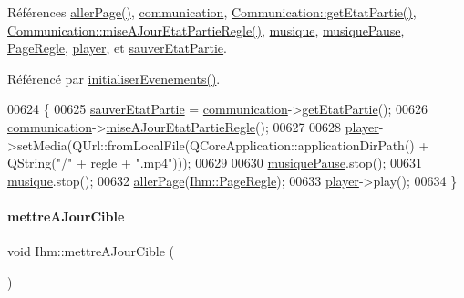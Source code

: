 Références \hyperlink{ihm_8cpp_source_l00429}{aller\+Page()}, \hyperlink{ihm_8h_source_l00054}{communication}, \hyperlink{communication_8cpp_source_l00049}{Communication\+::get\+Etat\+Partie()}, \hyperlink{communication_8cpp_source_l00426}{Communication\+::mise\+A\+Jour\+Etat\+Partie\+Regle()}, \hyperlink{ihm_8h_source_l00056}{musique}, \hyperlink{ihm_8h_source_l00057}{musique\+Pause}, \hyperlink{ihm_8h_source_l00075}{Page\+Regle}, \hyperlink{ihm_8h_source_l00064}{player}, et \hyperlink{ihm_8h_source_l00059}{sauver\+Etat\+Partie}.



Référencé par \hyperlink{ihm_8cpp_source_l00075}{initialiser\+Evenements()}.


\begin{DoxyCode}
00624 \{
00625     \hyperlink{class_ihm_a1a9d23dd4defa0b88d1e4a56ce807e45}{sauverEtatPartie} = \hyperlink{class_ihm_a2f3d4781795781a840786cd8c2233899}{communication}->\hyperlink{class_communication_a977495ad03ddf275aae49184c9a0dd1a}{getEtatPartie}();
00626     \hyperlink{class_ihm_a2f3d4781795781a840786cd8c2233899}{communication}->\hyperlink{class_communication_a01a86890468a8ecfb900bf15dcab92f2}{miseAJourEtatPartieRegle}();
00627 
00628     \hyperlink{class_ihm_a633230fb15d587e647ad9d2d6142ebc3}{player}->setMedia(QUrl::fromLocalFile(QCoreApplication::applicationDirPath() + QString(\textcolor{stringliteral}{"/"} + regle
       + \textcolor{stringliteral}{".mp4"})));
00629 
00630     \hyperlink{class_ihm_a11e7ae529b6adb7ac98f1aa512172ff2}{musiquePause}.stop();
00631     \hyperlink{class_ihm_a6e2a173ec36ee846d6210117b4b85fa8}{musique}.stop();
00632     \hyperlink{class_ihm_a52bf0bd258d00a16d3e1037a9288948b}{allerPage}(\hyperlink{class_ihm_a472c7a7bec7e6e0230842f78ace4833eaeb2ec486b2e880de96d76609d12c36af}{Ihm::PageRegle});
00633     \hyperlink{class_ihm_a633230fb15d587e647ad9d2d6142ebc3}{player}->play();
00634 \}
\end{DoxyCode}
\mbox{\label{class_ihm_a3c504c417aa2d3efd82ac5feded16895}} 
\paragraph{\texorpdfstring{mettre\+A\+Jour\+Cible}{mettreAJourCible}}
{\footnotesize\ttfamily void Ihm\+::mettre\+A\+Jour\+Cible (\begin{DoxyParamCaption}{ }\end{DoxyParamCaption})\hspace{0.3cm}{\ttfamily [slot]}}



